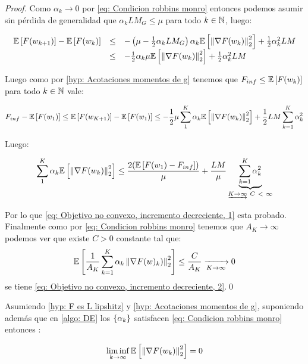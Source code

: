 \begin{proof}
	Como $\alpha_k \rightarrow 0$ por \ref{eq: Condicion robbins monro} entonces podemos asumir sin p\'erdida de generalidad que $\alpha_k L M_G \leq \mu$ para todo $k \in {\mathbb{N}}$, luego:
	
		\begin{equation*}
	\begin{array}{rcl}
	\mathbb{E} \left[F(w_{k+1})\right] - \mathbb{E} \left[F(w_k)\right] & \leq & - \left(\mu - \frac{1}{2}\alpha_k L M_G \right) \alpha_k \mathbb{E} \left[\left\lVert\nabla F(w_k)\right\rVert_2^2\right] + \frac{1}{2} \alpha_k^2 LM \\
	& \leq & - \frac{1}{2}\alpha_k \mu \mathbb{E} \left[\left\lVert\nabla F(w_k)\right\rVert_2^2\right] + \frac{1}{2} \alpha_k^2 LM
	\end{array}
	\end{equation*}
	
	Luego como por \ref{hyp: Acotaciones momentos de g} tenemos que $F_{inf} \leq \mathbb{E} \left[F(w_k)\right]$ para todo $k \in {\mathbb{N}}$ vale:
	
	\begin{equation*}
	F_{inf} - \mathbb{E} \left[F(w_1)\right] \leq \mathbb{E} \left[F(w_{K+1})\right] - \mathbb{E} \left[F(w_1)\right] \leq  - \frac{1}{2}\mu \sum\limits_{1}^{K}{\alpha_k \mathbb{E} \left[\left\lVert\nabla F(w_k)\right\rVert_2^2\right]} + \frac{1}{2} LM \sum\limits_{k=1}^{K} {\alpha_k^2}
	\end{equation*}
	
	Luego:
	
		\begin{equation*}
	\sum\limits_{1}^{K}{\alpha_k \expectation{\norm{\nabla F(w_k)}_2^2}}  \leq  \dfrac{2 (\expectation{F(w_1) - F_{inf} })}{\mu} + \frac{LM}{\mu}  \underbrace{\sum\limits_{k=1}^{K} {\alpha_k^2}}_{\underrightarrow{K \rightarrow \infty} \ C  \ < \ \infty }
	\end{equation*}
	
	Por lo que \ref{eq: Objetivo no convexo, incremento decreciente, 1} esta probado. Finalmente como por \ref{eq: Condicion robbins monro} tenemos que $A_K \rightarrow \infty$ podemos ver que existe $C>0$ constante tal que:
	\begin{equation*}
	\mathbb{E} \left[\dfrac{1}{A_K}\sum\limits_{k=1}^{K} {\alpha_k \left\lVert\nabla F (w)_k)\right\rVert_2^2}\right] \leq \dfrac{C}{A_K} \xrightarrow[K \rightarrow \infty]{} 0
	\end{equation*}
	se tiene \ref{eq: Objetivo no convexo, incremento decreciente, 2}.\qed
	
\end{proof}

\begin{corollary}
	\label{coro: Gradientes cerca de cero, Objetivo no convexo, Incrementos decrecientes}
	Asumiendo \ref{hyp: F es L lipshitz} y \ref{hyp: Acotaciones momentos de g}, suponiendo adem\'as que en \ref{algo: DE} los $\left\lbrace\alpha_k\right\rbrace$ satisfacen \ref{eq: Condicion robbins monro} entonces : 
	
	\begin{equation}
		\liminf\limits_{k \rightarrow \infty} {\mathbb{E} \left[\left\lVert\nabla F (w_k)\right\rVert_2^2\right]} = 0 
	\end{equation}
	
\end{corollary}

